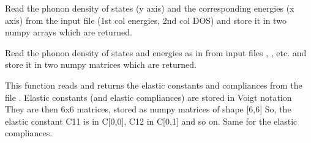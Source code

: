 \documentclass[letterpaper,10pt,english]{sphinxmanual}
\begin{document}

\begin{fulllineitems}
\label{pyqha:pyqha.read.read_celldmt_hex}
\end{fulllineitems}


\begin{fulllineitems}
\label{pyqha:pyqha.read.read_dos}
Read the phonon density of states (y axis) and the corresponding energies (x axis)
from the input file  (1st col energies, 2nd col DOS) and store it
in two numpy arrays which are returned.

\end{fulllineitems}


\begin{fulllineitems}
\label{pyqha:pyqha.read.read_dos_geo}
Read the phonon density of states and energies as in {\hyperref[pyqha:pyqha.read.read_dos]{}} from  input files
, , etc. and store it in two numpy matrices which are returned.

\end{fulllineitems}


\begin{fulllineitems}
\label{pyqha:pyqha.read.read_elastic_constants}
This function reads and returns the elastic constants and compliances from
the file  .
Elastic constants (and elastic compliances) are stored in Voigt notation 
They are then 6x6 matrices, stored as numpy matrices of shape {[}6,6{]}
So, the elastic constant C11 is in C{[}0,0{]}, C12 in C{[}0,1{]} and so on.
Same for the elastic compliances.

\end{fulllineitems}
\end{document}
